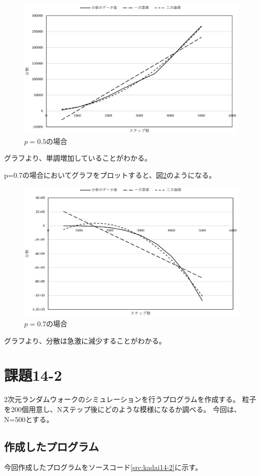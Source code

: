\documentclass[11pt,titlepage]{jsarticle}
\begin{document}
\begin{figure}[H]
\centering
\includegraphics[width=12cm]{img/kadai14_1_05.PNG}
\caption{$p=0.5$の場合}
\label{fig:kadai14_1_05}
\end{figure}

グラフより、単調増加していることがわかる。

p=0.7の場合においてグラフをプロットすると、図\ref{fig:kadai14_1_07}のようになる。

\begin{figure}[H]
\centering
\includegraphics[width=12cm]{img/kadai14_1_07.PNG}
\caption{$p=0.7$の場合}
\label{fig:kadai14_1_07}
\end{figure}

グラフより、分散は急激に減少することがわかる。


\section{課題14-2}
2次元ランダムウォークのシミュレーションを行うプログラムを作成する。
粒子を200個用意し、Nステップ後にどのような模様になるか調べる。
今回は、N=500とする。

\subsection{作成したプログラム}
今回作成したプログラムをソースコード\ref{src:kadai14-2}に示す。
\end{document}

